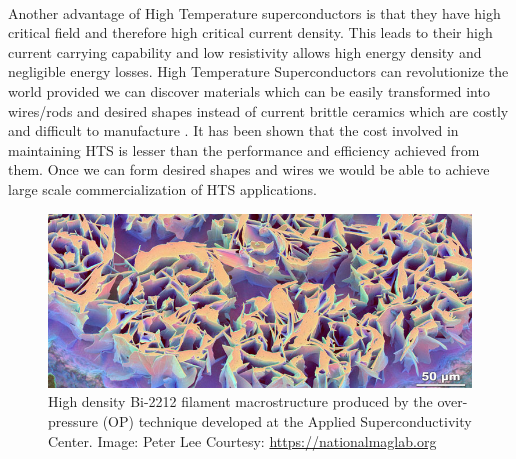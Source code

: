 \documentclass{article}
\begin{document}
	\paragraph{}
	Another advantage of High Temperature superconductors is that they have high critical field and therefore high critical current density. This leads to their high current carrying capability and low resistivity allows high energy density and negligible energy losses. High Temperature Superconductors can revolutionize the world provided we can discover materials which can be easily transformed into wires/rods and desired shapes instead of current brittle ceramics which are costly and difficult to manufacture \cite{ceramicsbarrier}. It has been shown that the cost involved in maintaining HTS is lesser than the performance and efficiency achieved from them. Once we can form desired shapes and wires we would be able to achieve large scale commercialization of HTS applications.
	
	\begin{figure}[h]
		\centering
		\includegraphics[width=16cm]{hts_etched_bi2212_nature_730.jpg}
		\caption{High density Bi-2212 filament macrostructure produced by the over-pressure (OP) technique developed at the Applied Superconductivity Center. Image: Peter Lee Courtesy: \href{https://nationalmaglab.org}{https://nationalmaglab.org}}
	\end{figure} 
	
\end{document}
